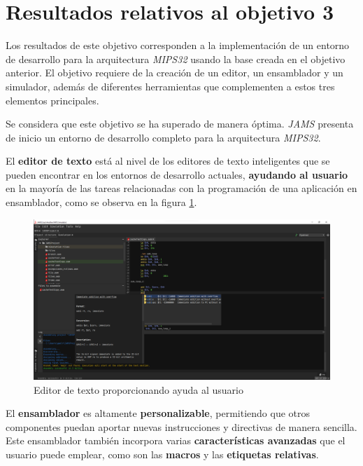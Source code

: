 \section{Resultados relativos al objetivo 3}\label{sec:resultados-relativos-al-objetivo-3}

Los resultados de este objetivo corresponden a la implementación
de un entorno de desarrollo para la arquitectura \textit{MIPS32}
usando la base creada en el objetivo anterior.
El objetivo requiere de la creación de un editor, un ensamblador
y un simulador, además de diferentes herramientas que complementen
a estos tres elementos principales.

Se considera que este objetivo se ha superado
de manera óptima.
\textit{JAMS} presenta de inicio un entorno de desarrollo completo
para la arquitectura \textit{MIPS32}.

El \textbf{editor de texto} está al nivel de los editores de texto
inteligentes que se pueden encontrar en los entornos de desarrollo
actuales, \textbf{ayudando al usuario} en la mayoría de las tareas
relacionadas con la programación de una aplicación en ensamblador, como se observa
en la figura \ref{fig:mips-editor}.

\begin{figure}[h]
    \centering
    \includegraphics[width=\textwidth]{images/result/mips-editor}
    \caption{Editor de texto proporcionando ayuda al usuario}
    \label{fig:mips-editor}
\end{figure}

El \textbf{ensamblador} es altamente \textbf{personalizable},
permitiendo que otros componentes puedan aportar nuevas instrucciones y
directivas de manera sencilla.
Este ensamblador también incorpora varias \textbf{características avanzadas}
que el usuario puede emplear, como son las \textbf{macros} y las
\textbf{etiquetas relativas}.

